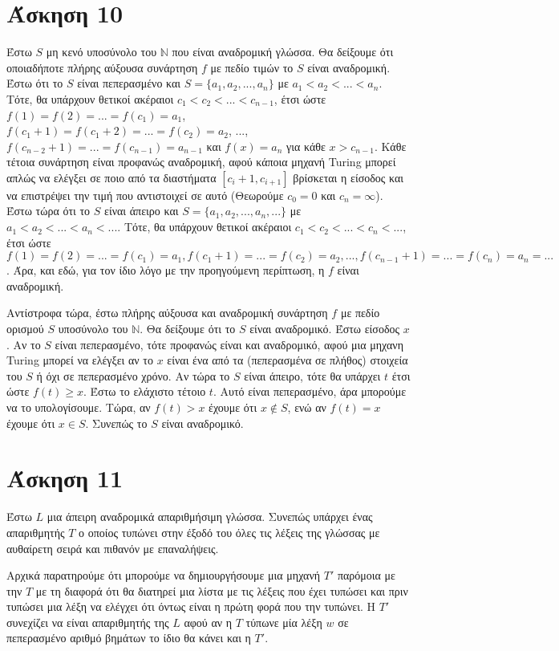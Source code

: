 \documentclass[a4paper, oneside, 11pt]{article}
\theoremstyle{definition}
\begin{document}
\section*{Άσκηση 10}

Έστω $S$ μη κενό υποσύνολο του $\mathbb{N}$ που είναι αναδρομική γλώσσα. Θα δείξουμε
ότι οποιαδήποτε πλήρης αύξουσα συνάρτηση $f$ με πεδίο τιμών το $S$ είναι αναδρομική.
Έστω ότι το $S$ είναι πεπερασμένο και $S=\{a_1,a_2,...,a_n\}$ με $a_1 < a_2 < ... < a_n$.
Τότε, θα υπάρχουν θετικοί ακέραιοι $c_1 < c_2 < ... < c_{n-1}$, έτσι ώστε 
$f(1)=f(2)=...=f(c_1)=a_1$, $f(c_1+1)=f(c_1+2)=...=f(c_2)=a_2$, ..., 
$f(c_{n-2}+1)=...=f(c_{n-1})=a_{n-1}$ και $f(x)=a_n$ για κάθε $x>c_{n-1}$. Κάθε τέτοια
συνάρτηση είναι προφανώς αναδρομική, αφού κάποια μηχανή Turing μπορεί απλώς να ελέγξει
σε ποιο από τα διαστήματα $[c_i+1,c_{i+1}]$ βρίσκεται η είσοδος και να επιστρέψει
την τιμή που αντιστοιχεί σε αυτό (Θεωρούμε $c_0=0$ και $c_n=\infty$).
Έστω τώρα ότι το $S$ είναι άπειρο και $S=\{a_1,a_2,...,a_n,...\}$ με 
$a_1<a_2<...<a_n<...$. Τότε, θα υπάρχουν θετικοί ακέραιοι $c_1 < c_2 < ... < c_n < ...$,
έτσι ώστε $f(1)=f(2)=...=f(c_1)=a_1, f(c_1+1)=...=f(c_2)=a_2, ... , f(c_{n-1}+1)=...=f(c_{n})=a_n = ...$.
Άρα, και εδώ, για τον ίδιο λόγο με την προηγούμενη περίπτωση, η $f$ είναι αναδρομική.

Αντίστροφα τώρα, έστω πλήρης αύξουσα και αναδρομική συνάρτηση $f$ με πεδίο ορισμού $S$
υποσύνολο του $\mathbb{N}$. Θα δείξουμε ότι το $S$ είναι αναδρομικό.
Έστω είσοδος $x$. 
Αν το $S$ είναι πεπερασμένο, τότε προφανώς είναι και αναδρομικό, αφού μια μηχανη Turing
μπορεί να ελέγξει αν το $x$ είναι ένα από τα (πεπερασμένα σε πλήθος) στοιχεία του $S$
ή όχι σε πεπερασμένο χρόνο. Αν τώρα το $S$ είναι άπειρο, τότε θα υπάρχει $t$ έτσι
ώστε $f(t) \geq x$. Έστω το ελάχιστο τέτοιο $t$. Αυτό είναι πεπερασμένο, άρα μπορούμε
να το υπολογίσουμε. Τώρα, αν $f(t) > x$ έχουμε ότι $x\notin S$, ενώ αν $f(t) = x$
έχουμε ότι $x\in S$. Συνεπώς το $S$ είναι αναδρομικό.

\section*{Άσκηση 11}

Έστω $L$ μια άπειρη αναδρομικά απαριθμήσιμη γλώσσα. Συνεπώς υπάρχει ένας απαριθμητής
$T$ ο οποίος τυπώνει στην έξοδό του όλες τις λέξεις της γλώσσας με αυθαίρετη σειρά
και πιθανόν με επαναλήψεις.

Αρχικά παρατηρούμε ότι μπορούμε να δημιουργήσουμε μια μηχανή $T'$ παρόμοια με την $T$
με τη διαφορά ότι θα διατηρεί μια λίστα με τις λέξεις που έχει τυπώσει και πριν
τυπώσει μια λέξη να ελέγχει ότι όντως είναι η πρώτη φορά που την τυπώνει. H $T'$
συνεχίζει να είναι απαριθμητής της $L$ αφού αν η $T$ τύπωνε μία λέξη $w$ σε
πεπερασμένο αριθμό βημάτων το ίδιο θα κάνει και η $T'$.
\end{document}
